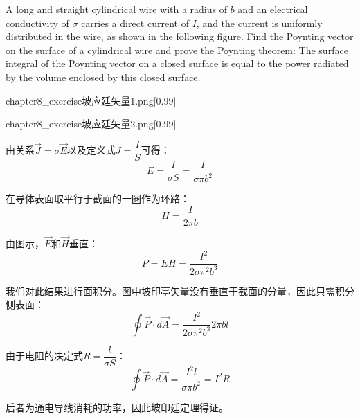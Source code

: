 \begin{solution}
    A long and straight cylindrical wire with a radius of \(b \) and an electrical conductivity of \(\sigma \) carries a direct current of \(I \), and the current is uniformly distributed 
    in the wire, as shown in the following figure. Find the Poynting vector on the surface of a cylindrical wire and prove the Poynting theorem: The surface integral of the Poynting vector 
    on a closed surface is equal to the power radiated by the volume enclosed by this closed surface.

    \begin{minipage}{0.45\textwidth}
        \centering
        \begin{singlefigure}[a]{chapter8_exercise坡应廷矢量1.png}[0.99]
        \end{singlefigure}
    \end{minipage}
    \begin{minipage}{0.45\textwidth}
        \centering  
        \begin{singlefigure}[b]{chapter8_exercise坡应廷矢量2.png}[0.99]
        \end{singlefigure}
    \end{minipage}
    \tcbrule

    由关系$\vec{J} = \sigma \vec{E}$以及定义式$J = \dfrac{I}{S}$可得：
    \[E = \dfrac{I}{\sigma S} = \dfrac{I}{\sigma\pi b^2}\]

    在导体表面取平行于截面的一圈作为环路：
    \[H = \dfrac{I}{2\pi b}\]

    由图示，$\vec{E}$和$\vec{H}$垂直：
    \[P = EH = \dfrac{I^2}{2\sigma\pi^2 b^3}\]

    我们对此结果进行面积分。图中坡印亭矢量没有垂直于截面的分量，因此只需积分侧表面：
    \[\oint \vec{P} \cdot d\vec{A} = \dfrac{I^2}{2\sigma\pi^2 b^3} 2\pi bl\]

    由于电阻的决定式$R = \dfrac{l}{\sigma S}$：
    \[\oint \vec{P} \cdot d\vec{A} = \dfrac{I^2 l}{\sigma\pi b^2} = I^2 R\]

    后者为通电导线消耗的功率，因此坡印廷定理得证。
\end{solution}

